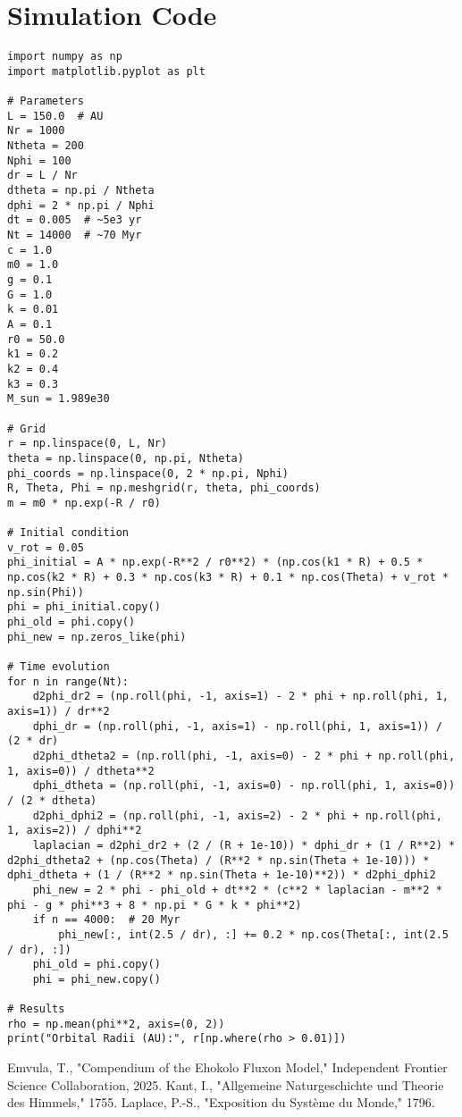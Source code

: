 \documentclass[11pt]{article}
\begin{document}
\section{Simulation Code}
\lstset{language=Python, basicstyle=\footnotesize\ttfamily, breaklines=true, numbers=left}
\begin{lstlisting}
import numpy as np
import matplotlib.pyplot as plt

# Parameters
L = 150.0  # AU
Nr = 1000
Ntheta = 200
Nphi = 100
dr = L / Nr
dtheta = np.pi / Ntheta
dphi = 2 * np.pi / Nphi
dt = 0.005  # ~5e3 yr
Nt = 14000  # ~70 Myr
c = 1.0
m0 = 1.0
g = 0.1
G = 1.0
k = 0.01
A = 0.1
r0 = 50.0
k1 = 0.2
k2 = 0.4
k3 = 0.3
M_sun = 1.989e30

# Grid
r = np.linspace(0, L, Nr)
theta = np.linspace(0, np.pi, Ntheta)
phi_coords = np.linspace(0, 2 * np.pi, Nphi)
R, Theta, Phi = np.meshgrid(r, theta, phi_coords)
m = m0 * np.exp(-R / r0)

# Initial condition
v_rot = 0.05
phi_initial = A * np.exp(-R**2 / r0**2) * (np.cos(k1 * R) + 0.5 * np.cos(k2 * R) + 0.3 * np.cos(k3 * R) + 0.1 * np.cos(Theta) + v_rot * np.sin(Phi))
phi = phi_initial.copy()
phi_old = phi.copy()
phi_new = np.zeros_like(phi)

# Time evolution
for n in range(Nt):
    d2phi_dr2 = (np.roll(phi, -1, axis=1) - 2 * phi + np.roll(phi, 1, axis=1)) / dr**2
    dphi_dr = (np.roll(phi, -1, axis=1) - np.roll(phi, 1, axis=1)) / (2 * dr)
    d2phi_dtheta2 = (np.roll(phi, -1, axis=0) - 2 * phi + np.roll(phi, 1, axis=0)) / dtheta**2
    dphi_dtheta = (np.roll(phi, -1, axis=0) - np.roll(phi, 1, axis=0)) / (2 * dtheta)
    d2phi_dphi2 = (np.roll(phi, -1, axis=2) - 2 * phi + np.roll(phi, 1, axis=2)) / dphi**2
    laplacian = d2phi_dr2 + (2 / (R + 1e-10)) * dphi_dr + (1 / R**2) * d2phi_dtheta2 + (np.cos(Theta) / (R**2 * np.sin(Theta + 1e-10))) * dphi_dtheta + (1 / (R**2 * np.sin(Theta + 1e-10)**2)) * d2phi_dphi2
    phi_new = 2 * phi - phi_old + dt**2 * (c**2 * laplacian - m**2 * phi - g * phi**3 + 8 * np.pi * G * k * phi**2)
    if n == 4000:  # 20 Myr
        phi_new[:, int(2.5 / dr), :] += 0.2 * np.cos(Theta[:, int(2.5 / dr), :])
    phi_old = phi.copy()
    phi = phi_new.copy()

# Results
rho = np.mean(phi**2, axis=(0, 2))
print("Orbital Radii (AU):", r[np.where(rho > 0.01)])
\end{lstlisting}




\begin{thebibliography}{9}
Emvula, T., "Compendium of the Ehokolo Fluxon Model," Independent Frontier Science Collaboration, 2025.
Kant, I., "Allgemeine Naturgeschichte und Theorie des Himmels," 1755.
Laplace, P.-S., "Exposition du Système du Monde," 1796.
\end{thebibliography}
\end{document}
